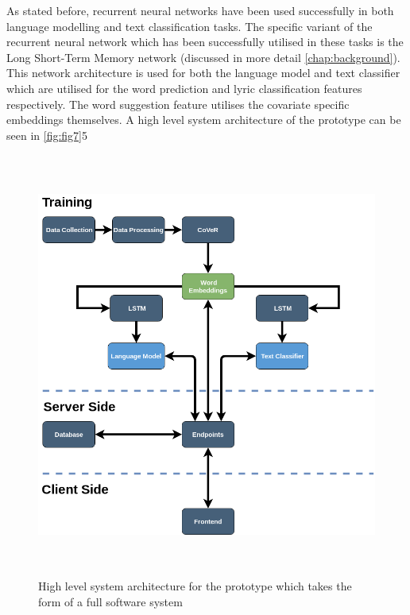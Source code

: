 \noindent
\newline
As stated before, recurrent neural networks have been used successfully in both language modelling and text classification tasks. The specific variant of the recurrent neural network which has been successfully utilised in these tasks is the Long Short-Term Memory network (discussed in more detail \autoref{chap:background}). This network architecture is used for both the language model and text classifier which are utilised for the word prediction and lyric classification features respectively. The word suggestion feature utilises the covariate specific embeddings themselves. A high level system architecture of the prototype can be seen in \autoref{fig:fig7}5
\begin{figure}[h]	
	\includegraphics[width=13cm, height=14cm]{./figures/fig7}
	\centering
	\caption{High level system architecture for the prototype which takes the form of a full software system}
	\label{fig:fig7}
\end{figure}
